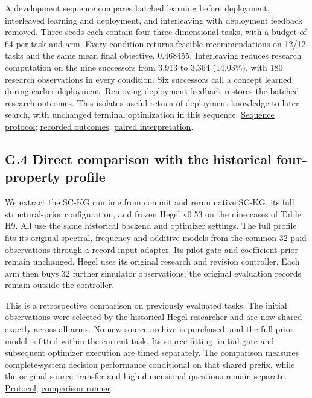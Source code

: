 \documentclass[11pt,a4paper]{article}
\begin{document}
A development sequence compares batched learning before deployment, interleaved
learning and deployment, and interleaving with deployment feedback removed.
Three seeds each contain four three-dimensional tasks, with a budget of 64 per
task and arm. Every condition returns feasible recommendations on 12/12 tasks
and the same mean final objective, 0.468455. Interleaving reduces research
computation on the nine successors from 3,913 to 3,364 (14.03\%), with 180 research
observations in every condition. Six successors call a concept learned during
earlier deployment. Removing deployment feedback restores the batched research
outcomes. This isolates useful return of deployment knowledge to later search,
with unchanged terminal optimization in this sequence.
\hyperlink{artifact-162}{Sequence protocol};
\hyperlink{artifact-163}{recorded outcomes};
\hyperlink{artifact-164}{paired interpretation}.


\subsection*{G.4 Direct comparison with the historical four-property profile}

We extract the SC-KG runtime from commit  and rerun native SC-KG,
its full structural-prior configuration, and frozen Hegel v0.53 on the nine
cases of Table H9. All use the same historical backend and optimizer settings.
The full profile fits its original spectral, frequency and additive models
from the common 32 paid observations through a record-input adapter. Its pilot
gate and coefficient prior remain unchanged. Hegel uses its original research
and revision controller. Each arm then buys 32 further simulator observations;
the original evaluation records remain outside the controller.


This is a retrospective comparison on previously evaluated tasks. The initial
observations were selected by the historical Hegel researcher and are now shared
exactly across all arms. No new source archive is purchased, and the full-prior
model is fitted within the current task. Its source fitting, initial gate and
subsequent optimizer execution are timed separately. The comparison measures
complete-system decision performance conditional on that shared prefix, while
the original source-transfer and high-dimensional questions remain separate.
\hyperlink{artifact-165}{Protocol};
\hyperlink{artifact-166}{comparison runner}.
\end{document}
